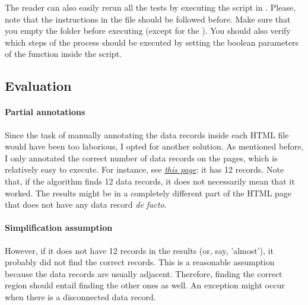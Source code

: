 \documentclass[10pt]{article}
\newcommand{\func}[1]{\path{#1()}}
\begin{document}


The reader can also easily rerun all the tests by executing the script in . Please, note that the instructions in the  file should be followed before. Make sure that you empty the  folder before executing (except for the ). You should also verify which steps of the process should be executed by setting the boolean parameters of the function \func{main} inside the script. 



\subsection{Evaluation}

\paragraph{Partial annotations} Since the task of manually annotating the data records inside each HTML file would have been too laborious, I opted for another solution. As mentioned before, I only annotated the correct number of data records on the pages, which is relatively easy to execute. For instance, see \href{https://www.circuitcity.com/products/health-personal-care-beauty.html}{\textit{this page}}: it has 12 records. Note that, if the algorithm finds 12 data records, it does not necessarily mean that it worked. The results might be in a completely different part of the HTML page that does not have any data record \emph{de facto}.

\paragraph{Simplification assumption} However, if it does not have 12 records in the results (or, say, 'almost'), it probably did not find the correct records. This is a reasonable assumption because the data records are usually adjacent. Therefore, finding the correct region should entail finding the other ones as well. An exception might occur when there is a disconnected data record\footnotemark.

\end{document}
